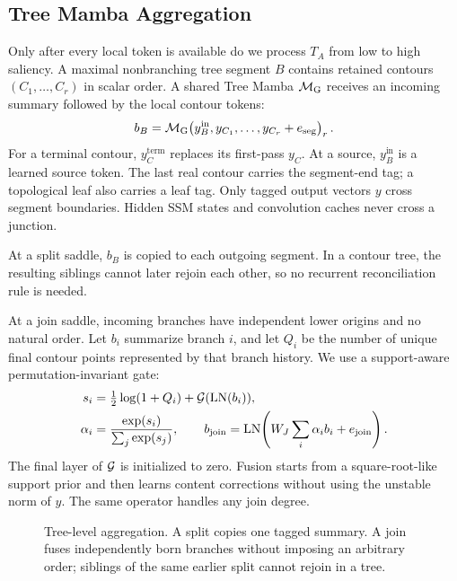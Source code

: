 \subsection{Tree Mamba Aggregation}

Only after every local token is available do we process $T_A$ from low to high saliency. A maximal nonbranching tree segment $B$ contains retained contours $(C_1,\ldots,C_r)$ in scalar order. A shared Tree Mamba $\mathcal{M}_{\mathrm{G}}$ receives an incoming summary followed by the local contour tokens:
\begin{equation}
b_B=\mathcal{M}_{\mathrm{G}}\!\left(y_B^{\mathrm{in}},y_{C_1},\ldots,y_{C_r}+e_{\mathrm{seg}}\right)_r.
\label{eq:branch}
\end{equation}
For a terminal contour, $y_C^{\mathrm{term}}$ replaces its first-pass $y_C$. At a source, $y_B^{\mathrm{in}}$ is a learned source token. The last real contour carries the segment-end tag; a topological leaf also carries a leaf tag. Only tagged output vectors $y$ cross segment boundaries. Hidden SSM states and convolution caches never cross a junction.

At a split saddle, $b_B$ is copied to each outgoing segment. In a contour tree, the resulting siblings cannot later rejoin each other, so no recurrent reconciliation rule is needed.

At a join saddle, incoming branches have independent lower origins and no natural order. Let $b_i$ summarize branch $i$, and let $Q_i$ be the number of unique final contour points represented by that branch history. We use a support-aware permutation-invariant gate:
\begin{align}
s_i &= \tfrac12\log(1+Q_i)+\mathcal{G}(\operatorname{LN}(b_i)),\\
\alpha_i &= \frac{\exp(s_i)}{\sum_j\exp(s_j)},\qquad
b_{\mathrm{join}}=\operatorname{LN}\!\left(W_J\sum_i\alpha_i b_i+e_{\mathrm{join}}\right).
\label{eq:join}
\end{align}
The final layer of $\mathcal{G}$ is initialized to zero. Fusion starts from a square-root-like support prior and then learns content corrections without using the unstable norm of $y$. The same operator handles any join degree.

\begin{figure}[t]
    \centering
    \resizebox{\columnwidth}{!}{}
    \caption{Tree-level aggregation. A split copies one tagged summary. A join fuses independently born branches without imposing an arbitrary order; siblings of the same earlier split cannot rejoin in a tree.}
    \label{fig:topology}
\end{figure}

